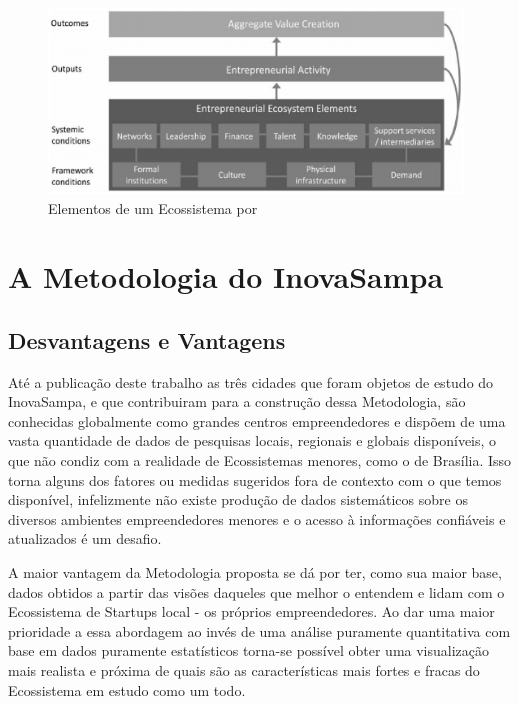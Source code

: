 \begin{figure}[!htb]
\centering
\includegraphics[width=11cm,angle=0]{figuras/elements_of_an_ecosystem}
\caption{Elementos de um Ecossistema por }
\label{figure:elements_of_an_ecosystem}
\end{figure}

\section{A Metodologia do InovaSampa}
\label{section:metodologia_do_inovasampa}

\subsection{Desvantagens e Vantagens}
\label{subsection:vantagens_e_desvantagens}

Até a publicação deste trabalho as três cidades que foram objetos de estudo do InovaSampa, e que contribuiram para a construção dessa Metodologia, são conhecidas globalmente como grandes centros empreendedores e dispõem de uma vasta quantidade de dados de pesquisas locais, regionais e globais disponíveis, o que não condiz com a realidade de Ecossistemas menores, como o de Brasília. Isso torna alguns dos fatores ou medidas sugeridos fora de contexto com o que temos disponível, infelizmente não existe produção de dados sistemáticos sobre os diversos ambientes empreendedores menores e o acesso à informações confiáveis e atualizados é um desafio.


A maior vantagem da Metodologia proposta se dá por ter, como sua maior base, dados obtidos a partir das visões daqueles que melhor o entendem e lidam com o Ecossistema de Startups local - os próprios empreendedores. Ao dar uma maior prioridade a essa abordagem ao invés de uma análise puramente quantitativa com base em dados puramente estatísticos torna-se possível obter uma visualização mais realista e próxima de quais são as características mais fortes e fracas do Ecossistema em estudo como um todo.

